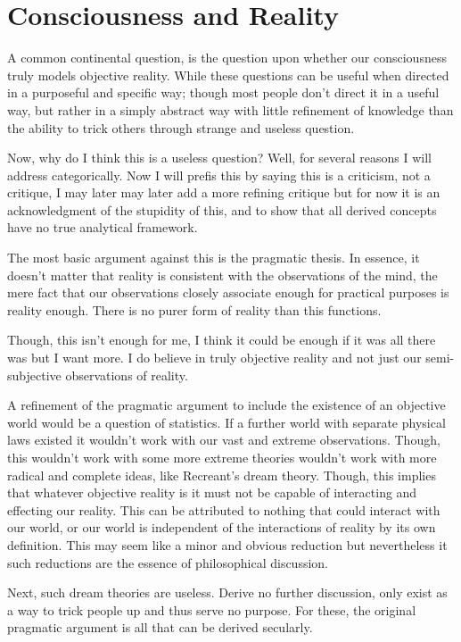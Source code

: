 \section{Consciousness and Reality}
\par A common continental question, is the question upon whether our consciousness truly models objective reality. While these questions can be useful when directed in a purposeful and specific way; though most people don't direct it in a useful way, but rather in a simply abstract way with little refinement of knowledge than the ability to trick others through strange and useless question.
\par Now, why do I think this is a useless question? Well, for several reasons I will address categorically. Now I will prefis this by saying this is a criticism, not a critique, I may later may later add a more refining critique but for now it is an acknowledgment of the stupidity of this, and to show that all derived concepts have no true analytical framework.
\par The most basic argument against this is the pragmatic thesis. In essence, it doesn't matter that reality is consistent with the observations of the mind, the mere fact that our observations closely associate enough for practical purposes is reality enough. There is no purer form of reality than this functions.
\par Though, this isn't enough for me, I think it could be enough if it was all there was but I want more. I do believe in truly objective reality and not just our semi-subjective observations of reality.
\par A refinement of the pragmatic argument to include the existence of an objective world would be a question of statistics. If a further world with separate physical laws existed it wouldn't work with our vast and extreme observations. Though, this wouldn't work with some more extreme theories wouldn't work with more radical and complete ideas, like Recreant's dream theory. Though, this implies that whatever objective reality is it must not be capable of interacting and effecting our reality. This can be attributed to nothing that could interact with our world, or our world is independent of the interactions of reality by its own definition. This may seem like a minor and obvious reduction but nevertheless it such reductions are the essence of philosophical discussion.
\par Next, such dream theories are useless. Derive no further discussion, only exist as a way to trick people up and thus serve no purpose. For these, the original pragmatic argument is all that can be derived secularly.
